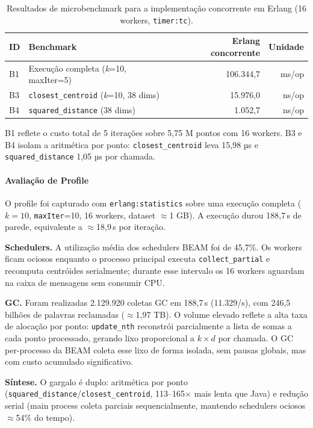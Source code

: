 \begin{table}[H]
\centering
\begin{tabular}{llrr}
\hline
\textbf{ID} & \textbf{Benchmark} & \textbf{Erlang concorrente} & \textbf{Unidade} \\
\hline
B1 & Execução completa (\textit{k}=10, maxIter=5) & 106.344{,}7 & ms/op \\
B3 & \texttt{closest\_centroid} (\textit{k}=10, 38 dims) & 15.976{,}0 & ns/op \\
B4 & \texttt{squared\_distance} (38 dims)                &  1.052{,}7 & ns/op \\
\hline
\end{tabular}
\caption{Resultados de microbenchmark para a implementação concorrente em Erlang
         (16 workers, \texttt{timer:tc}).}
\label{tab:bench-erlang-concurrent}
\end{table}

B1 reflete o custo total de 5 iterações sobre 5,75 M pontos com 16 workers.
B3 e B4 isolam a aritmética por ponto: \texttt{closest\_centroid} leva 15,98 µs
e \texttt{squared\_distance} 1,05 µs por chamada.

\paragraph{Avaliação de Profile}

O profile foi capturado com \texttt{erlang:statistics} sobre uma execução completa
($k=10$, \texttt{maxIter}=10, 16 workers, dataset $\approx$1 GB). A execução durou
188,7\,s de parede, equivalente a $\approx$18,9\,s por iteração.

\textbf{Schedulers.}
A utilização média dos schedulers BEAM foi de 45,7\%. Os workers ficam ociosos
enquanto o processo principal executa \texttt{collect\_partial} e recomputa
centróides serialmente; durante esse intervalo os 16 workers aguardam na caixa
de mensagens sem consumir CPU.

\textbf{GC.}
Foram realizadas 2.129.920 coletas GC em 188,7\,s (11.329/s), com 246,5 bilhões
de palavras reclamadas ($\approx$1,97 TB). O volume elevado reflete a alta taxa
de alocação por ponto: \texttt{update\_nth} reconstrói parcialmente a lista de
somas a cada ponto processado, gerando lixo proporcional a $k \times d$ por
chamada. O GC per-processo da BEAM coleta esse lixo de forma isolada, sem pausas
globais, mas com custo acumulado significativo.

\textbf{Síntese.}
O gargalo é duplo: aritmética por ponto
(\texttt{squared\_distance}/\texttt{closest\_centroid}, 113--165$\times$ mais
lenta que Java) e redução serial (main process coleta parciais sequencialmente,
mantendo schedulers ociosos $\approx$54\% do tempo).

